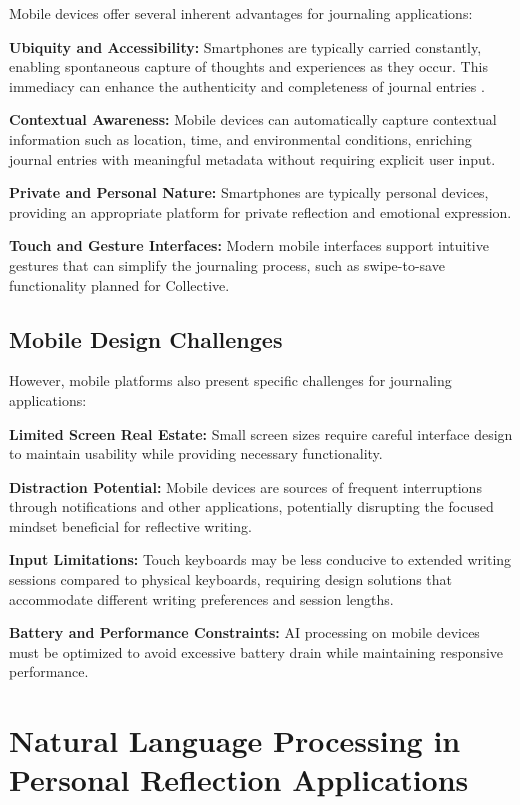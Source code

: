 Mobile devices offer several inherent advantages for journaling applications:

\textbf{Ubiquity and Accessibility:} Smartphones are typically carried constantly, enabling spontaneous capture of thoughts and experiences as they occur. This immediacy can enhance the authenticity and completeness of journal entries \cite{zhang2021breaking}.

\textbf{Contextual Awareness:} Mobile devices can automatically capture contextual information such as location, time, and environmental conditions, enriching journal entries with meaningful metadata without requiring explicit user input.

\textbf{Private and Personal Nature:} Smartphones are typically personal devices, providing an appropriate platform for private reflection and emotional expression.

\textbf{Touch and Gesture Interfaces:} Modern mobile interfaces support intuitive gestures that can simplify the journaling process, such as swipe-to-save functionality planned for Collective.

\subsection{Mobile Design Challenges}\label{subsec:mobile-challenges}

However, mobile platforms also present specific challenges for journaling applications:

\textbf{Limited Screen Real Estate:} Small screen sizes require careful interface design to maintain usability while providing necessary functionality.

\textbf{Distraction Potential:} Mobile devices are sources of frequent interruptions through notifications and other applications, potentially disrupting the focused mindset beneficial for reflective writing.

\textbf{Input Limitations:} Touch keyboards may be less conducive to extended writing sessions compared to physical keyboards, requiring design solutions that accommodate different writing preferences and session lengths.

\textbf{Battery and Performance Constraints:} AI processing on mobile devices must be optimized to avoid excessive battery drain while maintaining responsive performance.

\section{Natural Language Processing in Personal Reflection Applications}\label{sec:nlp}

